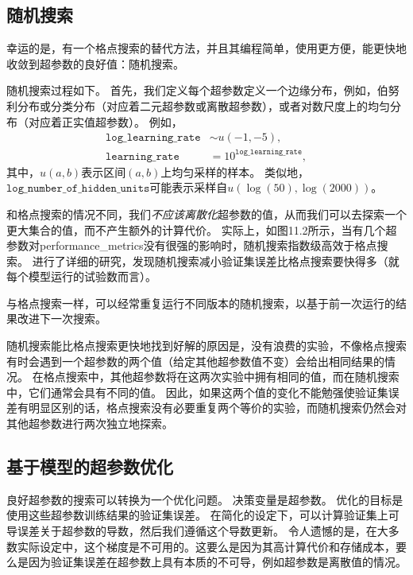 \subsection{随机搜索}
\label{subsec:random_search}
幸运的是，有一个格点搜索的替代方法，并且其编程简单，使用更方便，能更快地收敛到超参数的良好值：随机搜索\citep{Bergstra+Bengio-2012-small}。

随机搜索过程如下。
首先，我们定义每个超参数定义一个边缘分布，例如，伯努利分布或分类分布（对应着二元超参数或离散超参数），或者对数尺度上的均匀分布（对应着正实值超参数）。
例如，
\begin{align}
	\texttt{log\_learning\_rate} &\sim u(-1, -5), \\
	\texttt{learning\_rate} &= 10^{\texttt{log\_learning\_rate}},
\end{align}
其中，$u(a,b)$表示区间$(a,b)$上均匀采样的样本。
类似地，$\texttt{log\_number\_of\_hidden\_units}$可能表示采样自$u(\log(50), \log(2000))$。

和格点搜索的情况不同，我们\emph{不应该离散化}超参数的值，从而我们可以去探索一个更大集合的值，而不产生额外的计算代价。
实际上，如图11.2所示，当有几个超参数对\gls{performance_metrics}没有很强的影响时，随机搜索指数级高效于格点搜索。
\cite{Bergstra+Bengio-2012-small}进行了详细的研究，发现随机搜索减小验证集误差比格点搜索要快得多（就每个模型运行的试验数而言）。

与格点搜索一样，可以经常重复运行不同版本的随机搜索，以基于前一次运行的结果改进下一次搜索。

随机搜索能比格点搜索更快地找到好解的原因是，没有浪费的实验，不像格点搜索有时会遇到一个超参数的两个值（给定其他超参数值不变）会给出相同结果的情况。
在格点搜索中，其他超参数将在这两次实验中拥有相同的值，而在随机搜索中，它们通常会具有不同的值。
因此，如果这两个值的变化不能勉强使验证集误差有明显区别的话，格点搜索没有必要重复两个等价的实验，而随机搜索仍然会对其他超参数进行两次独立地探索。


\subsection{基于模型的超参数优化}
\label{subsec:model_based_hyperparameter_optimization}
良好超参数的搜索可以转换为一个优化问题。
决策变量是超参数。
优化的目标是使用这些超参数训练结果的验证集误差。
在简化的设定下，可以计算验证集上可导误差关于超参数的导数，然后我们遵循这个导数更新\citep{bengio:1999:snowbird,bengio-hyper-NC00,maclaurin2015gradient}。
令人遗憾的是，在大多数实际设定中，这个梯度是不可用的。这要么是因为其高计算代价和存储成本，要么是因为验证集误差在超参数上具有本质的不可导，例如超参数是离散值的情况。

